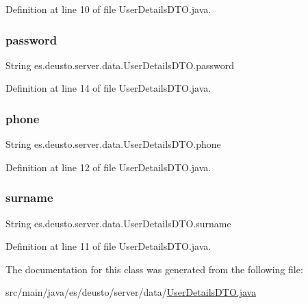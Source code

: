 Definition at line 10 of file User\+Details\+D\+T\+O.\+java.

\mbox{\label{classes_1_1deusto_1_1server_1_1data_1_1_user_details_d_t_o_a98c10832def6c14ba125dd9191789658}} 
\subsubsection{\texorpdfstring{password}{password}}
{\footnotesize\ttfamily String es.\+deusto.\+server.\+data.\+User\+Details\+D\+T\+O.\+password}



Definition at line 14 of file User\+Details\+D\+T\+O.\+java.

\mbox{\label{classes_1_1deusto_1_1server_1_1data_1_1_user_details_d_t_o_a02645a69a61019b6ef72367320d6c2ca}} 
\subsubsection{\texorpdfstring{phone}{phone}}
{\footnotesize\ttfamily String es.\+deusto.\+server.\+data.\+User\+Details\+D\+T\+O.\+phone}



Definition at line 12 of file User\+Details\+D\+T\+O.\+java.

\mbox{\label{classes_1_1deusto_1_1server_1_1data_1_1_user_details_d_t_o_a330072900fcfa1074bfd830396b42fd3}} 
\subsubsection{\texorpdfstring{surname}{surname}}
{\footnotesize\ttfamily String es.\+deusto.\+server.\+data.\+User\+Details\+D\+T\+O.\+surname}



Definition at line 11 of file User\+Details\+D\+T\+O.\+java.



The documentation for this class was generated from the following file\+:\begin{DoxyCompactItemize}
\item 
src/main/java/es/deusto/server/data/\mbox{\hyperlink{_user_details_d_t_o_8java}{User\+Details\+D\+T\+O.\+java}}\end{DoxyCompactItemize}
